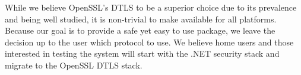 \documentclass[conference]{IEEEtran}
\begin{document}


While we believe OpenSSL's DTLS to be a superior choice due to its prevalence
and being well studied, it is non-trivial to make available for all platforms.
Because our goal is to provide a safe yet easy to use package, we leave the
decision up to the user which protocol to use.  We believe home users and those
interested in testing the system will start with the .NET security stack and
migrate to the OpenSSL DTLS stack.
\end{document}
